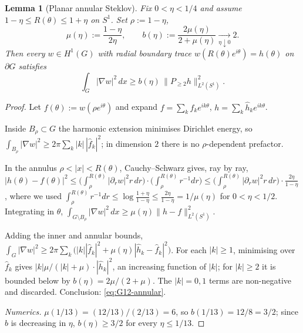 \documentclass[11pt]{amsart}
\newtheorem{lemma}[theorem]{Lemma}
\begin{document}
\begin{lemma}[Planar annular Steklov]\label{lem:G12-annular}
Fix \(0<\eta<1/4\) and assume
\(1-\eta\le R(\theta)\le 1+\eta\) on \(S^1\).  Set
\(\rho:=1-\eta\),
\begin{equation}\label{eq:mu-b-12}
   \mu(\eta):=\frac{1-\eta}{2\eta},
   \qquad
   b(\eta):=\frac{2\mu(\eta)}{2+\mu(\eta)}
   \xrightarrow[\eta\downarrow 0]{}2 .
\end{equation}
Then every \(w\in H^1(G)\) with radial boundary trace
\(w(R(\theta)e^{i\theta})=h(\theta)\) on \(\partial G\) satisfies
\begin{equation}\label{eq:G12-annular}
   \int_G|\nabla w|^2\,dx
     \ge b(\eta)\,\|P_{\ge 2}h\|_{L^2(S^1)}^2 .
\end{equation}
\end{lemma}

\begin{proof}
Let \(f(\theta):=w(\rho e^{i\theta})\) and expand
\(f=\sum_k\hat f_k e^{ik\theta}\),
\(h=\sum_k\hat h_k e^{ik\theta}\).

Inside \(B_\rho\subset G\) the harmonic extension minimises
Dirichlet energy, so
\(\int_{B_\rho}|\nabla w|^2\ge
2\pi\sum_k|k|\,|\hat f_k|^2\); in dimension \(2\) there is no
\(\rho\)-dependent prefactor.

In the annulus \(\rho<|x|<R(\theta)\), Cauchy--Schwarz gives, ray by
ray,
\(|h(\theta)-f(\theta)|^2\le
\bigl(\int_\rho^{R(\theta)}|\partial_r w|^2 r\,dr\bigr)\cdot
\bigl(\int_\rho^{R(\theta)}r^{-1}dr\bigr)\le
\bigl(\int_\rho^{R(\theta)}|\partial_r w|^2 r\,dr\bigr)
\cdot \tfrac{2\eta}{1-\eta}\),
where we used
\(\int_\rho^{R(\theta)}r^{-1}dr
\le\log\tfrac{1+\eta}{1-\eta}\le\tfrac{2\eta}{1-\eta}=1/\mu(\eta)\)
for \(0<\eta<1/2\).  Integrating in \(\theta\),
\(\int_{G\setminus B_\rho}|\nabla w|^2\,dx
\ge\mu(\eta)\|h-f\|_{L^2(S^1)}^2\).

Adding the inner and annular bounds,
\(\int_G|\nabla w|^2\ge
2\pi\sum_k\bigl(|k||\hat f_k|^2
+\mu(\eta)|\hat h_k-\hat f_k|^2\bigr)\).
For each \(|k|\ge 1\), minimising over \(\hat f_k\) gives
\(|k|\mu/(|k|+\mu)\cdot|\hat h_k|^2\), an increasing function of
\(|k|\); for \(|k|\ge 2\) it is bounded below by
\(b(\eta)=2\mu/(2+\mu)\).  The \(|k|=0,1\) terms are non-negative
and discarded.  Conclusion: \eqref{eq:G12-annular}.

\emph{Numerics.}  \(\mu(1/13)=(12/13)/(2/13)=6\), so
\(b(1/13)=12/8=3/2\); since \(b\) is decreasing in \(\eta\),
\(b(\eta)\ge 3/2\) for every \(\eta\le 1/13\).
\end{proof}
\end{document}
